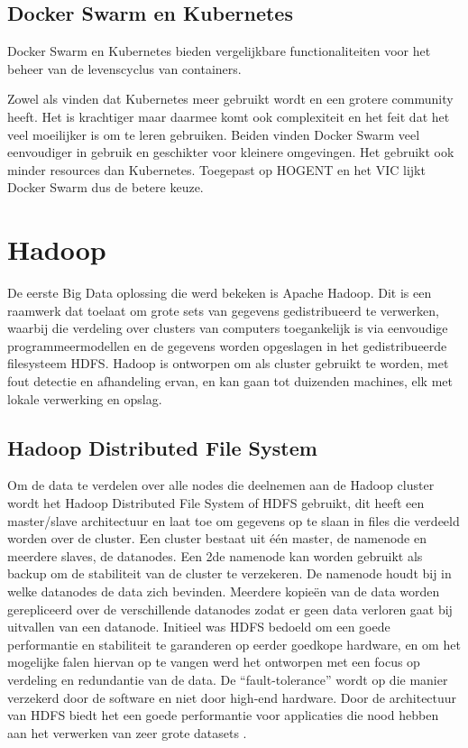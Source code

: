 \subsection{Docker Swarm en Kubernetes}
Docker Swarm en Kubernetes bieden vergelijkbare functionaliteiten voor het beheer van de levenscyclus van containers.

Zowel \textcite{Rosen2022} als \textcite{Chukwudi2023} vinden dat Kubernetes meer gebruikt wordt en een grotere community heeft. Het is krachtiger maar daarmee komt ook complexiteit en het feit dat het veel moeilijker is om te leren gebruiken.
Beiden vinden Docker Swarm veel eenvoudiger in gebruik en geschikter voor kleinere omgevingen. Het gebruikt ook minder resources dan Kubernetes.
\newline
Toegepast op HOGENT en het VIC lijkt Docker Swarm dus de betere keuze.


\section{Hadoop}
De eerste Big Data oplossing die werd bekeken is Apache Hadoop. Dit is een raamwerk dat toelaat om grote sets van gegevens gedistribueerd te verwerken, waarbij die verdeling over clusters van computers toegankelijk is via eenvoudige programmeermodellen en de gegevens worden opgeslagen in het gedistribueerde filesysteem HDFS.
\newline
Hadoop is ontworpen om als cluster gebruikt te worden, met fout detectie en afhandeling ervan, en kan gaan tot duizenden machines, elk met lokale verwerking en opslag. \autocite{ASF2022}

\subsection{Hadoop Distributed File System}
Om de data te verdelen over alle nodes die deelnemen aan de Hadoop cluster wordt het Hadoop Distributed File System of HDFS gebruikt, dit heeft een \newline master/slave architectuur en laat toe om gegevens op te slaan in files die verdeeld worden over de cluster. Een cluster bestaat uit \'e\'en master, de namenode en meerdere slaves, de datanodes. Een 2de namenode kan worden gebruikt als backup om de stabiliteit van de cluster te verzekeren.
\newline
De namenode houdt bij in welke datanodes de data zich bevinden. Meerdere kopieën van de data worden gerepliceerd over de verschillende datanodes zodat er geen data verloren gaat bij uitvallen van een datanode.
\newline
\newline
Initieel was HDFS bedoeld om een goede performantie en stabiliteit te garanderen op eerder goedkope hardware, en om het mogelijke falen hiervan op te vangen werd het ontworpen met een focus op verdeling en redundantie van de data. De ``fault-tolerance'' wordt op die manier verzekerd door de software en niet door high-end hardware.
Door de architectuur van HDFS biedt het een goede performantie voor applicaties die nood hebben aan het verwerken van zeer grote datasets \autocite{Borthakur2007}.

